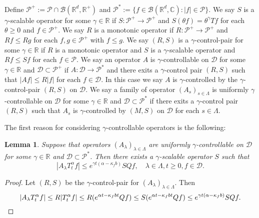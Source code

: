 \documentclass[12pt,oneside,english]{amsart}
\theoremstyle{plain}
\newtheorem{lem}[thm]{Lemma}
\theoremstyle{definition}
\numberwithin{equation}{section}
\newcommand{\added}[1]{{\color{blue}#1}}\newcommand{\deleted}[1]{{\color{red}#1}}
\begin{document}
\added{
\subsection{}
    Define $\mathcal P^+:= \mathcal P \cap \mathcal B(\mathbb R^d, \mathbb R^+)$ and $\mathcal P^*:= \{f\in \mathscr B(\mathbb R^d, \mathbb C): |f|\in \mathcal P\}$.
    We say $S$ is a $\gamma$-scalable operator for some $\gamma\in \mathbb R$ if $S: \mathcal P^+ \to \mathcal P^+$ and $S(\theta f) = \theta^\gamma Tf$ for each $\theta \geq 0$ and $f \in \mathcal P^+$.
    We say $R$ is a monotonic operator if $R:\mathcal P^+ \to \mathcal P^+$ and $Rf \leq Rg$ for each $f, g \in \mathcal P^+$ with $f\leq g$. 
    We say $(R,S)$ is a $\gamma$-control-pair for some $\gamma \in \mathbb R$ if $R$ is a monotonic operator and $S$ is a $\gamma$-scalable operator and $Rf\leq Sf$ for each $f\in \mathcal P$.
    We say an operator $A$ is $\gamma$-controllable on $\mathcal D$ for some $\gamma \in \mathbb R$ and $\mathcal D \subset \mathcal P^+$ if $A: \mathcal D \to \mathcal P^*$ and there exits a $\gamma$-control pair $(R,S)$ such that $|Af|\leq R|f|$ for each $f\in \mathcal D$. 
    In this case we say $A$ is $\gamma$-controlled by the $\gamma$-control-pair $(R,S)$ on $\mathcal D$.
    We say a family of operator $(A_s)_{s\in \Lambda}$ is uniformly $\gamma$-controllable on $\mathcal D$ for some $\gamma \in \mathbb R$ and $\mathcal D \subset \mathcal P^*$ if there exits a $\gamma$-control pair $(R,S)$ such that $A_s$ is $\gamma$-controlled by $(M, S)$ on $\mathcal D$ for each $s\in \Lambda$.
}
\added{
    The first reason for considering $\gamma$-controllable operators is the following:
\begin{lem}
    Suppose that operators $(A_\lambda)_{\lambda\in \Lambda}$ are uniformly $\gamma$-controllable on $\mathcal D$ for some $\gamma \in \mathbb R$ and $\mathcal D \subset \mathcal P^*$.
    Then there exists a $\gamma$-scalable operator $S$ such that
\[
    |A_\lambda T_t^\alpha f|
    \leq e^{\gamma t (\alpha  - \kappa_f b)} SQf,
    \quad \lambda \in \Lambda, t\geq 0, f\in \mathcal D.
\]
\end{lem}
}
\added{
\begin{proof}
    Let $(R,S)$ be the $\gamma$-control-pair for $(A_\lambda)_{\lambda\in \Lambda}$. 
    Then
\[
    |A_\lambda T_t^\alpha f| \leq R|T_t^\alpha f|
    \leq R (e^{\alpha t  - \kappa_f bt}Qf)
    \leq S (e^{\alpha t  - \kappa_f bt}Qf)
    \leq e^{\gamma t (\alpha  - \kappa_f b)} SQf.
    \qedhere
\]
\end{proof}
}
\end{document}
